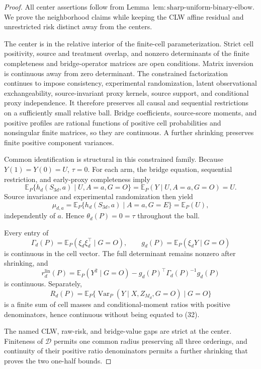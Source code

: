 \documentclass{article}
\begin{document}
\begin{proof}
All center assertions follow from Lemma~\(\mathrm{lem{:}sharp\text{-}uniform\text{-}binary\text{-}elbow}\).  We prove the neighborhood claims while keeping the CLW affine residual and unrestricted risk distinct away from the centers.

The center is in the relative interior of the finite-cell parameterization.  Strict cell positivity, source and treatment overlap, and nonzero determinants of the finite completeness and bridge-operator matrices are open conditions.  Matrix inversion is continuous away from zero determinant.  The constrained factorization continues to impose consistency, experimental randomization, latent observational exchangeability, source-invariant proxy kernels, source support, and conditional proxy independence.  It therefore preserves all causal and sequential restrictions on a sufficiently small relative ball.  Bridge coefficients, source-score moments, and positive profiles are rational functions of positive cell probabilities and nonsingular finite matrices, so they are continuous.  A further shrinking preserves finite positive component variances.

Common identification is structural in this constrained family.  Because \(Y(1)=Y(0)=U\), \(\tau=0\).  For each arm, the bridge equation, sequential restriction, and early-proxy completeness imply
\[
 \mathbb E_P\{h_d(S_{3d},a)\mid U,A=a,G=O\}
 =\mathbb E_P(Y\mid U,A=a,G=O)=U.
\]
Source invariance and experimental randomization then yield
\[
 \mu_{d,a}
 =\mathbb E_P\{h_d(S_{3d},a)\mid A=a,G=E\}
 =\mathbb E_P(U),
\]
independently of \(a\).  Hence \(\theta_d(P)=0=\tau\) throughout the ball.

Every entry of
\[
 \Gamma_d(P)=\mathbb E_P(\xi_d\xi_d^\top\mid G=O),
 \qquad g_d(P)=\mathbb E_P(\xi_dY\mid G=O)
\]
is continuous in the cell vector.  The full determinant remains nonzero after shrinking, and
\[
 r_d^{\mathrm{lin}}(P)=
 \mathbb E_P(Y^2\mid G=O)
 -g_d(P)^\top\Gamma_d(P)^{-1}g_d(P)                       \tag{32}
\]
is continuous.  Separately,
\[
 R_d(P)=\mathbb E_P\{\operatorname{Var}_P(Y\mid X,Z_{M_d},G=O)\mid G=O\}
\]
is a finite sum of cell masses and conditional-moment ratios with positive denominators, hence continuous without being equated to (32).

The named CLW, raw-risk, and bridge-value gaps are strict at the center.  Finiteness of \(\mathcal D\) permits one common radius preserving all three orderings, and continuity of their positive ratio denominators permits a further shrinking that proves the two one-half bounds.


\end{proof}
\end{document}
